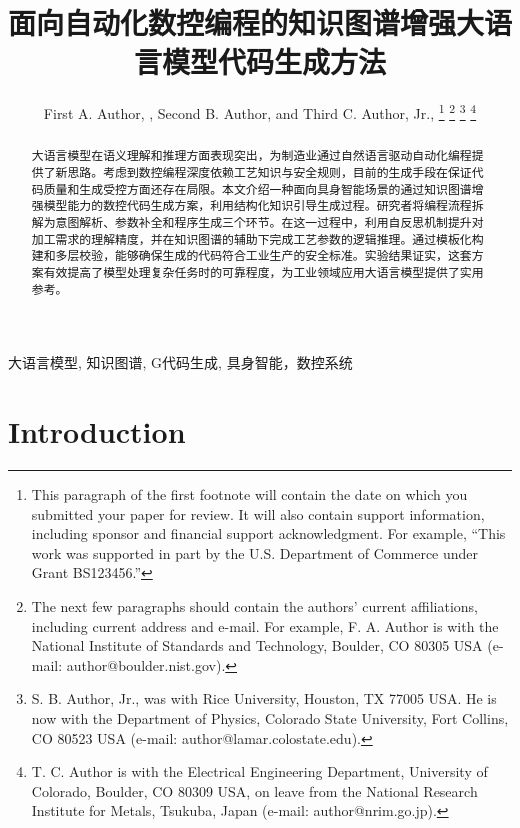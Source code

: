 \documentclass[journal,twoside,web]{ieeecolor}
\begin{document}
\title{面向自动化数控编程的知识图谱增强大语言模型代码生成方法}
\author{First A. Author, , Second B. Author, and Third C. Author, Jr., 
\thanks{This paragraph of the first footnote will contain the date on 
which you submitted your paper for review. It will also contain support 
information, including sponsor and financial support acknowledgment. For 
example, ``This work was supported in part by the U.S. Department of 
Commerce under Grant BS123456.'' }
\thanks{The next few paragraphs should contain 
the authors' current affiliations, including current address and e-mail. For 
example, F. A. Author is with the National Institute of Standards and 
Technology, Boulder, CO 80305 USA (e-mail: author@boulder.nist.gov). }
\thanks{S. B. Author, Jr., was with Rice University, Houston, TX 77005 USA. He is 
now with the Department of Physics, Colorado State University, Fort Collins, 
CO 80523 USA (e-mail: author@lamar.colostate.edu).}
\thanks{T. C. Author is with 
the Electrical Engineering Department, University of Colorado, Boulder, CO 
80309 USA, on leave from the National Research Institute for Metals, 
Tsukuba, Japan (e-mail: author@nrim.go.jp).}}

\maketitle

\begin{abstract}
大语言模型在语义理解和推理方面表现突出，为制造业通过自然语言驱动自动化编程提供了新思路。考虑到数控编程深度依赖工艺知识与安全规则，目前的生成手段在保证代码质量和生成受控方面还存在局限。本文介绍一种面向具身智能场景的通过知识图谱增强模型能力的数控代码生成方案，利用结构化知识引导生成过程。研究者将编程流程拆解为意图解析、参数补全和程序生成三个环节。在这一过程中，利用自反思机制提升对加工需求的理解精度，并在知识图谱的辅助下完成工艺参数的逻辑推理。通过模板化构建和多层校验，能够确保生成的代码符合工业生产的安全标准。实验结果证实，这套方案有效提高了模型处理复杂任务时的可靠程度，为工业领域应用大语言模型提供了实用参考。
\end{abstract}

\begin{IEEEkeywords}
大语言模型, 知识图谱, G代码生成, 具身智能，数控系统
\end{IEEEkeywords}

\section{Introduction}
\label{sec:introduction}
\end{document}
